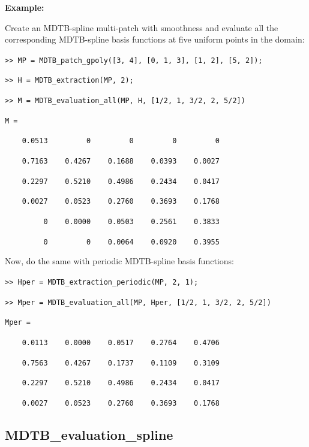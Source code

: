 \documentclass[10pt]{acmtrans2e}
\newenvironment{example}
{\vspace*{0.1cm}
\noindent \textbf{Example:} \vspace*{0.15cm}

\setlength{\parskip}{0.5ex plus 0.5exminus 0.2 ex}
}
{\medskip
}
\begin{document}
\begin{example}
\noindent Create an MDTB-spline multi-patch with smoothness and evaluate all the corresponding MDTB-spline basis functions at five uniform points in the domain:
\medskip

\texttt{>> MP = MDTB\_patch\_gpoly([3, 4], [0, 1, 3], [1, 2], [5, 2]);}

\texttt{>> H = MDTB\_extraction(MP, 2);}

\texttt{>> M = MDTB\_evaluation\_all(MP, H, [1/2, 1, 3/2, 2, 5/2])}

\texttt{M =}

\texttt{\ \ \ \ 0.0513\ \ \ \ \ \ \ \ \ 0\ \ \ \ \ \ \ \ \ 0\ \ \ \ \ \ \ \ \ 0\ \ \ \ \ \ \ \ \ 0}

\texttt{\ \ \ \ 0.7163\ \ \ \ 0.4267\ \ \ \ 0.1688\ \ \ \ 0.0393\ \ \ \ 0.0027}

\texttt{\ \ \ \ 0.2297\ \ \ \ 0.5210\ \ \ \ 0.4986\ \ \ \ 0.2434\ \ \ \ 0.0417}

\texttt{\ \ \ \ 0.0027\ \ \ \ 0.0523\ \ \ \ 0.2760\ \ \ \ 0.3693\ \ \ \ 0.1768}

\texttt{\ \ \ \ \ \ \ \ \ 0\ \ \ \ 0.0000\ \ \ \ 0.0503\ \ \ \ 0.2561\ \ \ \ 0.3833}

\texttt{\ \ \ \ \ \ \ \ \ 0\ \ \ \ \ \ \ \ \ 0\ \ \ \ 0.0064\ \ \ \ 0.0920\ \ \ \ 0.3955}

\pagebreak

\noindent Now, do the same with periodic MDTB-spline basis functions:
\medskip

\texttt{>> Hper = MDTB\_extraction\_periodic(MP, 2, 1);}

\texttt{>> Mper = MDTB\_evaluation\_all(MP, Hper, [1/2, 1, 3/2, 2, 5/2])}

\texttt{Mper =}

\texttt{\ \ \ \ 0.0113\ \ \ \ 0.0000\ \ \ \ 0.0517\ \ \ \ 0.2764\ \ \ \ 0.4706}

\texttt{\ \ \ \ 0.7563\ \ \ \ 0.4267\ \ \ \ 0.1737\ \ \ \ 0.1109\ \ \ \ 0.3109}

\texttt{\ \ \ \ 0.2297\ \ \ \ 0.5210\ \ \ \ 0.4986\ \ \ \ 0.2434\ \ \ \ 0.0417}

\texttt{\ \ \ \ 0.0027\ \ \ \ 0.0523\ \ \ \ 0.2760\ \ \ \ 0.3693\ \ \ \ 0.1768}
\end{example}


\subsection{MDTB\_evaluation\_spline} \label{sec:matlab-mdtb-evaluation-spline}
\end{document}
